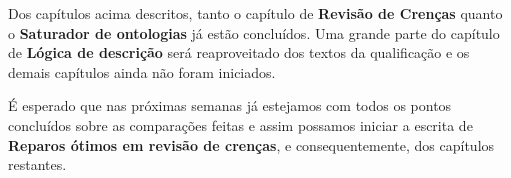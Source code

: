 \documentclass[a4paper,12pt,twoside,english,brazilian]{article}
\begin{document}
Dos capítulos acima descritos, tanto o capítulo de \textbf{Revisão de Crenças} quanto o \textbf{Saturador de ontologias} já estão concluídos. Uma grande parte do capítulo de \textbf{Lógica de descrição} será reaproveitado dos textos da qualificação e os demais capítulos ainda não foram iniciados.

É esperado que nas próximas semanas já estejamos com todos os pontos concluídos sobre as comparações feitas e assim possamos iniciar a escrita de \textbf{Reparos ótimos em revisão de crenças}, e consequentemente, dos capítulos restantes.


\end{document}
